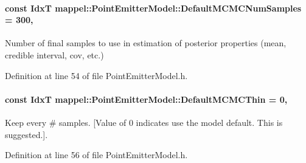 \paragraph[{\texorpdfstring{Default\+M\+C\+M\+C\+Num\+Samples}{DefaultMCMCNumSamples}}]{\setlength{\rightskip}{0pt plus 5cm}const {\bf IdxT} mappel\+::\+Point\+Emitter\+Model\+::\+Default\+M\+C\+M\+C\+Num\+Samples = 300\hspace{0.3cm}{\ttfamily [static]}, {\ttfamily [inherited]}}\hypertarget{classmappel_1_1PointEmitterModel_a9bbed2f2e91f1e5f0f4f9389cd2de333}{}\label{classmappel_1_1PointEmitterModel_a9bbed2f2e91f1e5f0f4f9389cd2de333}


Number of final samples to use in estimation of posterior properties (mean, credible interval, cov, etc.) 



Definition at line 54 of file Point\+Emitter\+Model.\+h.

\paragraph[{\texorpdfstring{Default\+M\+C\+M\+C\+Thin}{DefaultMCMCThin}}]{\setlength{\rightskip}{0pt plus 5cm}const {\bf IdxT} mappel\+::\+Point\+Emitter\+Model\+::\+Default\+M\+C\+M\+C\+Thin = 0\hspace{0.3cm}{\ttfamily [static]}, {\ttfamily [inherited]}}\hypertarget{classmappel_1_1PointEmitterModel_aac243ab7c6862c3d9ce3af8ca8a17e6c}{}\label{classmappel_1_1PointEmitterModel_aac243ab7c6862c3d9ce3af8ca8a17e6c}


Keep every \# samples. \mbox{[}Value of 0 indicates use the model default. This is suggested.\mbox{]}. 



Definition at line 56 of file Point\+Emitter\+Model.\+h.

